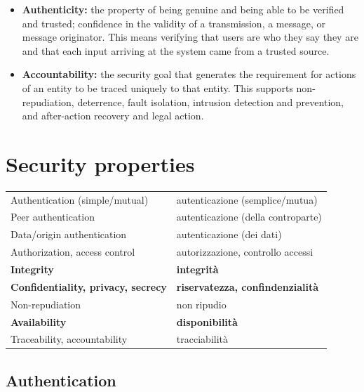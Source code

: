 \begin{itemize}
	\item \textbf{Authenticity:} the property of being genuine and being able to be verified and trusted; confidence in the validity of a transmission, a message, or message originator. This means verifying that users are who they say they are and that each input arriving at the system came from a trusted source.

	\item \textbf{Accountability:} the security goal that generates the requirement for actions of an entity to be traced uniquely to that entity. This supports non-repudiation, deterrence, fault isolation, intrusion detection and prevention, and after-action recovery and legal action.
\end{itemize}

\section{Security properties}\label{cap:secprop}
\begin{center}
	\begin{tabular}{||l l||}
		\hline
		Authentication (simple/mutual)             & autenticazione (semplice/mutua)         \\
		Peer authentication                        & autenticazione (della controparte)      \\
		Data/origin authentication                 & autenticazione (dei dati)               \\
		Authorization, access control              & autorizzazione, controllo accessi       \\
		\textbf{Integrity}                         & \textbf{integrità}                      \\
		\textbf{Confidentiality, privacy, secrecy} & \textbf{riservatezza, confindenzialità} \\
		Non-repudiation                            & non ripudio                             \\
		\textbf{Availability}                      & \textbf{disponibilità}                  \\
		Traceability, accountability               & tracciabilità                           \\
		\hline
	\end{tabular}
\end{center}


\subsection{Authentication}


